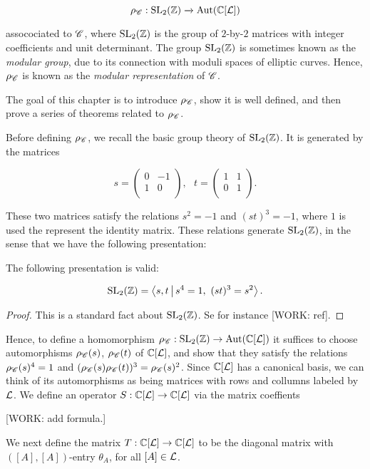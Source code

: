 $$\rho_{\mathscr{C}}:\operatorname{SL}_2(\mathbb{Z})\xrightarrow{}\operatorname{Aut}(\mathbb{C}[\mathcal{L}])$$

assocociated to $\mathscr{C}$, where $\operatorname{SL}_2(\mathbb{Z})$ is the group of $2$-by-$2$ matrices with integer coefficients and unit determinant. The group $\operatorname{SL}_2(\mathbb{Z})$ is sometimes known as the \textit{modular group}, due to its connection with moduli spaces of elliptic curves. Hence, $\rho_{\mathscr{C}}$ is known as the \textit{modular representation} of $\mathscr{C}$.

The goal of this chapter is to introduce $\rho_{\mathscr{C}}$, show it is well defined, and then prove a series of theorems related to $\rho_{\mathscr{C}}$.

Before defining $\rho_{\mathscr{C}}$, we recall the basic group theory of $\operatorname{SL}_2(\mathbb{Z})$. It is generated by the matrices

$$
s=
\begin{pmatrix}
0 & -1 \\
1 & 0 \\
\end{pmatrix},
\,\,\,\,
t=
\begin{pmatrix}
1 & 1 \\
0 & 1 \\
\end{pmatrix}.
$$

These two matrices satisfy the relations $s^2=-1$ and $(st)^3=-1$, where $1$ is used the represent the identity matrix. These relations generate $\operatorname{SL}_2(\mathbb{Z})$, in the sense that we have the following presentation:

\begin{proposition} The following presentation is valid:

$$\operatorname{SL}_2(\mathbb{Z})=\Braket{s,t | s^4=1,\,\, (st)^3=s^2}.$$
\end{proposition}
\begin{proof} This is a standard fact about $\operatorname{SL}_2(\mathbb{Z})$. Se for instance [WORK: ref].
\end{proof}

Hence, to define a homomorphism $\rho_{\mathscr{C}}:\operatorname{SL}_2(\mathbb{Z})\to \operatorname{Aut}(\mathbb{C}[\mathcal{L}])$ it suffices to choose automorphisms $\rho_{\mathscr{C}}(s)$, $\rho_{\mathscr{C}}(t)$ of $\mathbb{C}[\mathcal{L}]$, and show that they satisfy the relations $\rho_{\mathscr{C}}(s)^4=1$ and $(\rho_{\mathscr{C}}(s)\rho_{\mathscr{C}}(t))^3=\rho_{\mathscr{C}}(s)^2$. Since $\mathbb{C}[\mathcal{L}]$ has a canonical basis, we can think of its automorphisms as being matrices with rows and collumns labeled by $\mathcal{L}$. We define an operator $S:\mathbb{C}[\mathcal{L}]\to \mathbb{C}[\mathcal{L}]$ via the matrix coeffients

[WORK: add formula.]

We next define the matrix $T:\mathbb{C}[\mathcal{L}]\to\mathbb{C}[\mathcal{L}]$ to be the diagonal matrix with $([A],[A])$-entry $\theta_{A}$, for all $[A]\in \mathcal{L}$.

